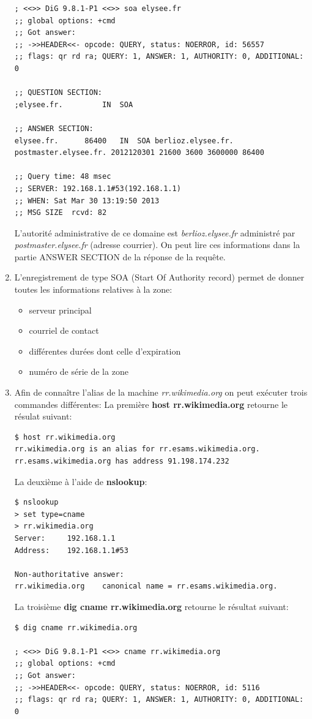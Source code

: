 \documentclass[a4paper,10pt]{article}
\begin{document}
\begin{enumerate}
\begin{verbatim}
; <<>> DiG 9.8.1-P1 <<>> soa elysee.fr
;; global options: +cmd
;; Got answer:
;; ->>HEADER<<- opcode: QUERY, status: NOERROR, id: 56557
;; flags: qr rd ra; QUERY: 1, ANSWER: 1, AUTHORITY: 0, ADDITIONAL: 0

;; QUESTION SECTION:
;elysee.fr.			IN	SOA

;; ANSWER SECTION:
elysee.fr.		86400	IN	SOA	berlioz.elysee.fr. postmaster.elysee.fr. 2012120301 21600 3600 3600000 86400

;; Query time: 48 msec
;; SERVER: 192.168.1.1#53(192.168.1.1)
;; WHEN: Sat Mar 30 13:19:50 2013
;; MSG SIZE  rcvd: 82
\end{verbatim}
L'autorité administrative de ce domaine est \textit{berlioz.elysee.fr} administré par \textit{postmaster.elysee.fr} (adresse courrier). On peut lire ces informations dans la partie ANSWER SECTION de la réponse de la requête.
\item L'enregistrement de type SOA (Start Of Authority record) permet de donner toutes les informations relatives à la zone:
\begin{itemize}
\item serveur principal
\item courriel de contact
\item différentes durées dont celle d'expiration
\item numéro de série de la zone
\end{itemize}
\item Afin de connaître l'alias de la machine \textit{rr.wikimedia.org} on peut exécuter trois commandes différentes:\newline
La première \textbf{host rr.wikimedia.org} retourne le résulat suivant:
\begin{verbatim}
$ host rr.wikimedia.org
rr.wikimedia.org is an alias for rr.esams.wikimedia.org.
rr.esams.wikimedia.org has address 91.198.174.232
\end{verbatim}
La deuxième à l'aide de \textbf{nslookup}:
\begin{verbatim}
$ nslookup
> set type=cname
> rr.wikimedia.org
Server:		192.168.1.1
Address:	192.168.1.1#53

Non-authoritative answer:
rr.wikimedia.org	canonical name = rr.esams.wikimedia.org.
\end{verbatim}
La troisième \textbf{dig cname rr.wikimedia.org} retourne le résultat suivant:
\begin{verbatim}
$ dig cname rr.wikimedia.org

; <<>> DiG 9.8.1-P1 <<>> cname rr.wikimedia.org
;; global options: +cmd
;; Got answer:
;; ->>HEADER<<- opcode: QUERY, status: NOERROR, id: 5116
;; flags: qr rd ra; QUERY: 1, ANSWER: 1, AUTHORITY: 0, ADDITIONAL: 0


\end{verbatim}
\end{enumerate}
\end{document}
